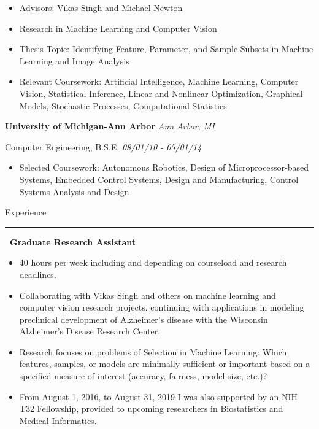 \documentclass[]{article}
\begin{document}
	\vspace{-5pt}
	\begin{itemize}[label={$\bullet$}]
		\item Advisors: Vikas Singh and Michael Newton
		\item Research in Machine Learning and Computer Vision
		\item Thesis Topic: Identifying Feature, Parameter, and Sample Subsets in Machine Learning and Image Analysis
		\item Relevant Coursework: Artificial Intelligence,  Machine Learning, Computer Vision, Statistical Inference, Linear and Nonlinear Optimization, Graphical Models, Stochastic Processes, Computational Statistics
	\end{itemize}
 {{\bf\large University of Michigan-Ann Arbor} \hfill \textit{Ann Arbor, MI} }
 
	{ Computer Engineering, B.S.E. \hfill \textit{08/01/10 - 05/01/14} }
	
	\vspace{-5pt}
	\begin{itemize}[label={$\bullet$}]
		\item Selected Coursework: Autonomous Robotics, Design of Microprocessor-based Systems, Embedded Control Systems, Design and Manufacturing, Control Systems Analysis and Design
	\end{itemize}

\vspace{15pt}
{\LARGE Experience}
\hrule
\vspace{10pt}

 \newline
{\bf \ Graduate Research Assistant}
\begin{itemize}[label={$\bullet$}]
	\item 40 hours per week including and depending on courseload and research deadlines.
	\item Collaborating with Vikas Singh and others on machine learning and computer vision research projects, continuing with applications in modeling preclinical development of Alzheimer's disease with the Wisconsin Alzheimer's Disease Research Center.
	\item Research focuses on problems of Selection in Machine Learning: Which features, samples, or models are minimally sufficient or important based on a specified measure of interest (accuracy, fairness, model size, etc.)?
	\item From August 1, 2016, to August 31, 2019 I was also supported by an NIH T32 Fellowship, provided to upcoming researchers in Biostatistics and Medical Informatics.
\end{itemize} 
\end{document}
